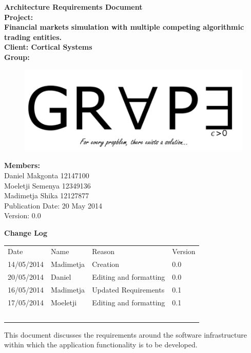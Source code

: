 \documentclass[12pt]{article}
\newcommand{\Title}{Architecture Requirements Document} %
\begin{document}
	\begin{center}%
		\LARGE \bf \Title \\[2em]
		\Large {Project:}\\
		Financial markets simulation with multiple competing algorithmic trading entities.\\[0.7em]
		\Large {Client:}
		Cortical Systems\\[2em]
		\LARGE {\bf Group:}\\
			\begin{figure}[ht!]
				\centering
				\includegraphics[scale=0.4]{Logo8.png}
			\end{figure}
			
		\Large {\bf Members:}\\[0.3em]
		\large
		Daniel Makgonta 12147100\\
		Moeletji Semenya 12349136\\
		Madimetja Shika 12127877\\[3em]
	
	\small Publication Date: 20 May 2014\\[0.5em]
	\small Version: 0.0 		    
	\end{center}%
	
	\newpage		
	\LARGE 
 	{\bf Change Log}\\[1em]
	\begin{tabular}{llll}
		Date & Name & Reason & Version \\
		14/05/2014 & Madimetja & Creation & 0.0 \\
		20/05/2014 & Daniel & Editing and formatting & 0.0 \\
		16/05/2014 & Madimetja & Updated Requirements & 0.1 \\
		17/05/2014 & Moeletji & Editing and formatting & 0.1 \\
		~ & ~ & ~ & ~ \\
	\end{tabular}
	

	\newpage
	\tableofcontents
				  
	\newpage
	This document discusses the requirements around the software infrastructure within which the application functionality is to be developed. 
\end{document}

